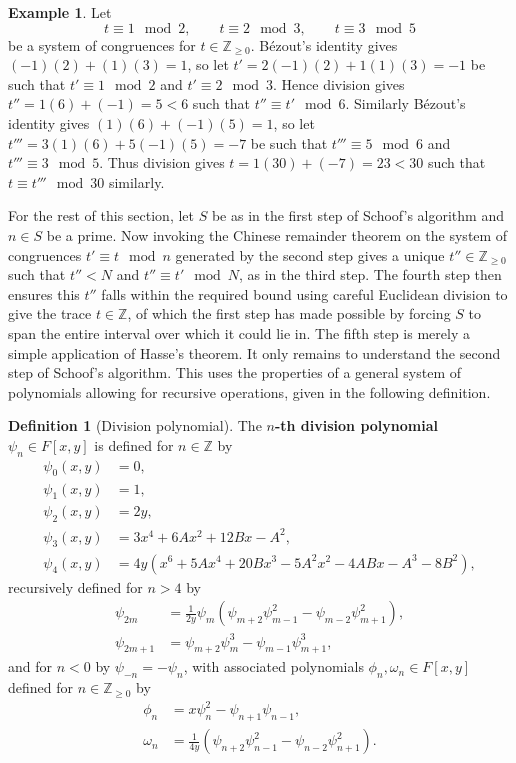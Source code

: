 \documentclass{article}
\newcommand{\Z}{\mathbb{Z}}
\newcommand{\rb}[1]{\left( #1 \right)}
\renewcommand{\sb}[1]{\left[ #1 \right]}
\theoremstyle{definition}
\newtheorem*{definition}{Definition}
\newtheorem*{example}{Example}
\begin{document}
\begin{example}
Let
$$ t \equiv 1 \mod 2, \qquad t \equiv 2 \mod 3, \qquad t \equiv 3 \mod 5 $$
be a system of congruences for $ t \in \Z_{\ge 0} $. B\'ezout's identity gives $ \rb{-1}\rb{2} + \rb{1}\rb{3} = 1 $, so let $ t' = 2\rb{-1}\rb{2} + 1\rb{1}\rb{3} = -1 $ be such that $ t' \equiv 1 \mod 2 $ and $ t' \equiv 2 \mod 3 $. Hence division gives $ t'' = 1\rb{6} + \rb{-1} = 5 < 6 $ such that $ t'' \equiv t' \mod 6 $. Similarly B\'ezout's identity gives $ \rb{1}\rb{6} + \rb{-1}\rb{5} = 1 $, so let $ t''' = 3\rb{1}\rb{6} + 5\rb{-1}\rb{5} = -7 $ be such that $ t''' \equiv 5 \mod 6 $ and $ t''' \equiv 3 \mod 5 $. Thus division gives $ t = 1\rb{30} + \rb{-7} = 23 < 30 $ such that $ t \equiv t''' \mod 30 $ similarly.
\end{example}

For the rest of this section, let $ S $ be as in the first step of Schoof's algorithm and $ n \in S $ be a prime. Now invoking the Chinese remainder theorem on the system of congruences $ t' \equiv t \mod n $ generated by the second step gives a unique $ t'' \in \Z_{\ge 0} $ such that $ t'' < N $ and $ t'' \equiv t' \mod N $, as in the third step. The fourth step then ensures this $ t'' $ falls within the required bound using careful Euclidean division to give the trace $ t \in \Z $, of which the first step has made possible by forcing $ S $ to span the entire interval over which it could lie in. The fifth step is merely a simple application of Hasse's theorem. It only remains to understand the second step of Schoof's algorithm. This uses the properties of a general system of polynomials allowing for recursive operations, given in the following definition.

\begin{definition}[Division polynomial]
The \textbf{$ n $-th division polynomial} $ \psi_n \in F\sb{x, y} $ is defined for $ n \in \Z $ by
\begin{align*}
\psi_0\rb{x, y} & = 0, \\
\psi_1\rb{x, y} & = 1, \\
\psi_2\rb{x, y} & = 2y, \\
\psi_3\rb{x, y} & = 3x^4 + 6Ax^2 + 12Bx - A^2, \\
\psi_4\rb{x, y} & = 4y\rb{x^6 + 5Ax^4 + 20Bx^3 - 5A^2x^2 - 4ABx - A^3 - 8B^2},
\end{align*}
recursively defined for $ n > 4 $ by
\begin{align*}
\psi_{2m} & = \tfrac{1}{2y}\psi_m\rb{\psi_{m + 2}\psi_{m - 1}^2 - \psi_{m - 2}\psi_{m + 1}^2}, \\
\psi_{2m + 1} & = \psi_{m + 2}\psi_m^3 - \psi_{m - 1}\psi_{m + 1}^3,
\end{align*}
and for $ n < 0 $ by $ \psi_{-n} = -\psi_n $, with associated polynomials $ \phi_n, \omega_n \in F\sb{x, y} $ defined for $ n \in \Z_{\ge 0} $ by
\begin{align*}
\phi_n & = x\psi_n^2 - \psi_{n + 1}\psi_{n - 1}, \\
\omega_n & = \tfrac{1}{4y}\rb{\psi_{n + 2}\psi_{n - 1}^2 - \psi_{n - 2}\psi_{n + 1}^2}.
\end{align*}
\end{definition}
\end{document}
